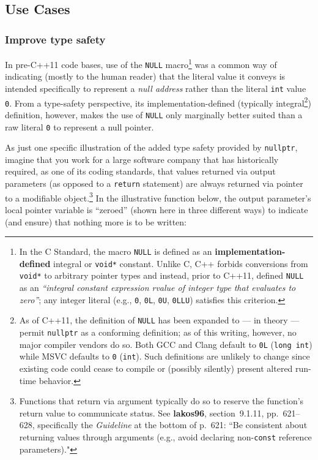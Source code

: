 \subsection[Use Cases]{Use Cases}\label{use-cases}

\subsubsection[Improve type safety]{Improve type safety}\label{improve-type-safety}

In pre-C++11 code bases, use of the \texttt{NULL}
macro{\cprotect\footnote{In the C Standard, the macro \texttt{NULL} is
defined as an \textbf{implementation-defined} integral or \texttt{void*}
constant. Unlike C, C++ forbids conversions from \texttt{void*} to
arbitrary pointer types and instead, prior to C++11, defined
\texttt{NULL} as an \emph{``integral constant expression rvalue of
integer type that evaluates to zero''}; any integer literal (e.g.,
\texttt{0}, \texttt{0L}, \texttt{0U}, \texttt{0LLU}) satisfies this
  criterion.}} was a common way of indicating (mostly to the human
reader) that the literal value it conveys is intended specifically to
represent a \emph{null address} rather than the literal \texttt{int}
value \texttt{0}. From a type-safety perspective, its
implementation-defined (typically integral{\cprotect\footnote{As of
C++11, the definition of \texttt{NULL} has been expanded to --- in
theory --- permit \texttt{nullptr} as a conforming definition; as of
this writing, however, no major compiler vendors do so. Both GCC and
Clang default to \texttt{0L} (\texttt{long}~\texttt{int}) while MSVC
defaults to \texttt{0} (\texttt{int}). Such definitions are unlikely
to change since existing code could cease to compile or (possibly
  silently) present altered run-time behavior.}}) definition, however,
makes the use of \texttt{NULL} only marginally better suited than a raw
literal \texttt{0} to represent a null pointer.

As just one specific illustration of the added type safety provided by
\texttt{nullptr}, imagine that you work for a large software company
that has historically required, as one of its coding standards, that
values returned via output parameters (as opposed to a \texttt{return}
statement) are always returned via pointer to a modifiable
object.{\cprotect\footnote{Functions that return via argument typically
do so to reserve the function's return value to communicate status.
  See \textbf{{lakos96}}, section~9.1.11, pp.~621--628, specifically the
  \emph{Guideline} at the bottom of p.~621: ``Be consistent about
  returning values through arguments (e.g., avoid declaring
  non-\texttt{const} reference parameters)."}} In the illustrative function below, the output parameter's local pointer
variable is ``zeroed'' (shown here in three different ways) to indicate
(and ensure) that nothing more is to be written:

